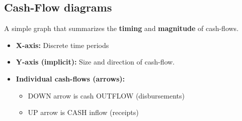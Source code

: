 \subsection{Cash-Flow diagrams}
\begin{definition}
    A simple graph that summarizes the \textbf{timing} and \textbf{magnitude} of cash-flows.
    \begin{itemize}
        \item \textbf{X-axis:} Discrete time periods
        \item \textbf{Y-axis (implicit):} Size and direction of cash-flow.
        \item \textbf{Individual cash-flows (arrows):} 
            \begin{itemize}
                \item DOWN arrow is cash OUTFLOW (disbursements)
                \item UP arrow is CASH inflow (receipts)
            \end{itemize}
    \end{itemize}
\end{definition}

